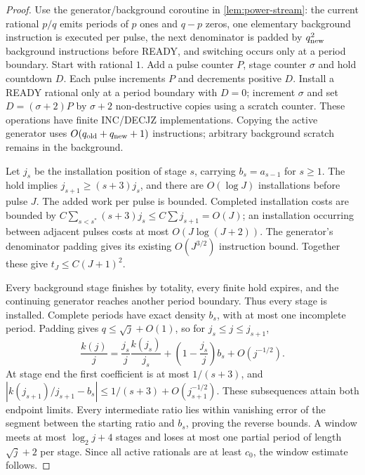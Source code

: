 \begin{proof}
Use the generator/background coroutine in \cref{lem:power-stream}: the current rational $p/q$ emits periods of $p$ ones and $q-p$ zeros, one elementary background instruction is executed per pulse, the next denominator is padded by $q_{\rm new}^2$ background instructions before READY, and switching occurs only at a period boundary. Start with rational $1$. Add a pulse counter $P$, stage counter $\sigma$ and hold countdown $D$. Each pulse increments $P$ and decrements positive $D$. Install a READY rational only at a period boundary with $D=0$; increment $\sigma$ and set $D=(\sigma+2)P$ by $\sigma+2$ non-destructive copies using a scratch counter. These operations have finite INC/DECJZ implementations. Copying the active generator uses $O(q_{\rm old}+q_{\rm new}+1)$ instructions; arbitrary background scratch remains in the background.

Let $j_s$ be the installation position of stage $s$, carrying $b_s=a_{s-1}$ for $s\ge1$. The hold implies $j_{s+1}\ge(s+3)j_s$, and there are $O(\log J)$ installations before pulse $J$. The added work per pulse is bounded. Completed installation costs are bounded by $C\sum_{s<s^*}(s+3)j_s\le C\sum j_{s+1}=O(J)$; an installation occurring between adjacent pulses costs at most $O(J\log(J+2))$. The generator's denominator padding gives its existing $O(J^{3/2})$ instruction bound. Together these give $t_J\le C(J+1)^2$.

Every background stage finishes by totality, every finite hold expires, and the continuing generator reaches another period boundary. Thus every stage is installed. Complete periods have exact density $b_s$, with at most one incomplete period. Padding gives $q\le\sqrt j+O(1)$, so for $j_s\le j\le j_{s+1}$,
\begin{equation}\label{eq:profile-hold-density}
 \frac{k(j)}j=\frac{j_s}j\frac{k(j_s)}{j_s}
  +\left(1-\frac{j_s}j\right)b_s+O(j^{-1/2}).
\end{equation}
At stage end the first coefficient is at most $1/(s+3)$, and $|k(j_{s+1})/j_{s+1}-b_s|\le1/(s+3)+O(j_{s+1}^{-1/2})$. These subsequences attain both endpoint limits. Every intermediate ratio lies within vanishing error of the segment between the starting ratio and $b_s$, proving the reverse bounds. A window meets at most $\log_2j+4$ stages and loses at most one partial period of length $\sqrt j+2$ per stage. Since all active rationals are at least $c_0$, the window estimate follows.
\end{proof}

